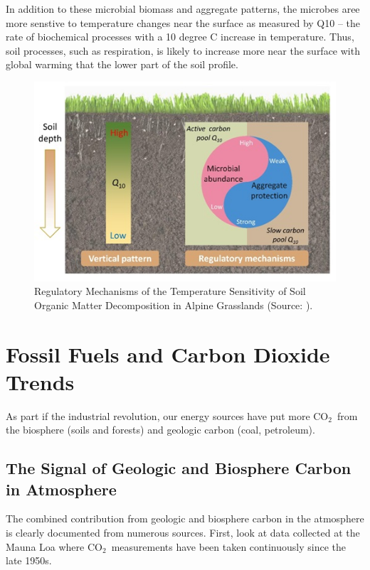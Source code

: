 \documentclass{book}\usepackage{knitr}
\newcommand{\carbondioxide}{CO$_2$~}
\begin{document}
\begin{knitrout}
\begin{kframe}
In addition to these microbial biomass and aggregate patterns, the microbes aree more senstive to temperature changes near the surface as measured by Q10 -- the rate of biochemical processes with a 10 degree C increase in temperature. Thus, soil processes, such as respiration, is likely to increase more near the surface with global warming that the lower part of the soil profile.  

\begin{figure}
\includegraphics[width=\linewidth]{images/earth-system/Q10-SOC-Regulation.jpg}
\caption{Regulatory Mechanisms of the Temperature Sensitivity of Soil Organic Matter Decomposition in Alpine Grasslands (Source: \citet{Qineaau1218, CAS2021researchers}).}
\label{fig:Q10-SOC}
\end{figure}


\section{Fossil Fuels and Carbon Dioxide Trends}\label{sec:fossilfuels}

As part if the industrial revolution, our energy sources have put more \carbondioxide from the biosphere (soils and forests) and geologic carbon (coal, petroleum). 

\subsection{The Signal of Geologic and Biosphere Carbon in Atmosphere}

The combined contribution from geologic and biosphere carbon in the atmosphere is clearly documented from numerous sources. First, look at data collected at the Mauna Loa where \carbondioxide measurements have been taken continuously since the late 1950s. 


\end{kframe}
\end{knitrout}
\end{document}
